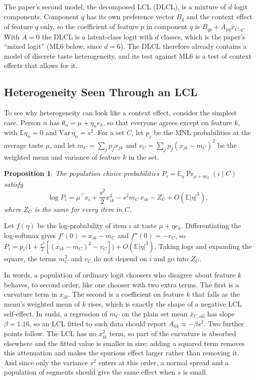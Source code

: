 \documentclass[11pt,journal,a4paper]{IEEEtran}
\newtheorem{proposition}{Proposition}
\newcommand{\xb}{\bar{x}}
\newcommand{\E}{\mathbb{E}}
\begin{document}
The paper's second model, the decomposed LCL (DLCL), is a mixture of $d$ logit components. Component $q$ has
its own preference vector $B_q$ and the context effect of feature $q$ only, so the coefficient of feature $p$
in component $q$ is $B_{qp}+A_{pq}\xb_{C,q}$. With $A=0$ the DLCL is a latent-class logit with $d$ classes,
which is the paper's ``mixed logit'' (ML6 below, since $d=6$). The DLCL therefore already contains a model of
discrete taste heterogeneity, and its test against ML6 is a test of context effects that allows for it.

\subsection{Heterogeneity Seen Through an LCL}

To see why heterogeneity can look like a context effect, consider the simplest case. Person $n$ has
$\theta_n=\mu+\eta_ne_k$, so that everyone agrees except on feature $k$, with $\E\eta_n=0$ and
$\mathrm{Var}\,\eta_n=s^2$. For a set $C$, let $p_j$ be the MNL probabilities at the average taste $\mu$, and
let $m_C=\sum_jp_jx_{jk}$ and $v_C=\sum_jp_j(x_{jk}-m_C)^2$ be the weighted mean and variance of feature $k$
in the set.

\begin{proposition}\label{prop:expansion}
The population choice probabilities $P_i=\E_\eta\Pr_{\mu+\eta e_k}(i\mid C)$ satisfy
\begin{equation}
\log P_i=\mu^\top x_i+\frac{s^2}{2}x_{ik}^2-s^2m_C\,x_{ik}-Z_C+O(\E|\eta|^3),
\label{eq:expansion}
\end{equation}
where $Z_C$ is the same for every item in $C$.
\end{proposition}

\begin{IEEEproof}
Let $f(\eta)$ be the log-probability of item $i$ at taste $\mu+\eta e_k$. Differentiating the log-softmax
gives $f'(0)=x_{ik}-m_C$ and $f''(0)=-v_C$, so
$P_i=p_i\big(1+\tfrac{s^2}{2}[(x_{ik}-m_C)^2-v_C]\big)+O(\E|\eta|^3)$. Taking logs and expanding the square,
the terms $m_C^2$ and $v_C$ do not depend on $i$ and go into $Z_C$.
\end{IEEEproof}

In words, a population of ordinary logit choosers who disagree about feature $k$ behaves, to second order,
like one chooser with two extra terms. The first is a curvature term in $x_{ik}$. The second is a coefficient
on feature $k$ that falls as the menu's weighted mean of $k$ rises, which is exactly the shape of a negative
LCL self-effect. In sushi, a regression of $m_C$ on the plain set mean $\xb_{C,\mathrm{oil}}$ has slope
$\beta=1.16$, so an LCL fitted to such data should report $A_{kk}\approx-\beta s^2$. Two further points follow.
The LCL has no $x_{ik}^2$ term, so part of the curvature is absorbed elsewhere and the fitted value is smaller
in size; adding a squared term removes this attenuation and makes the spurious effect larger rather than
removing it. And since only the variance $s^2$ enters at this order, a normal spread and a population of
segments should give the same effect when $s$ is small.
\end{document}
